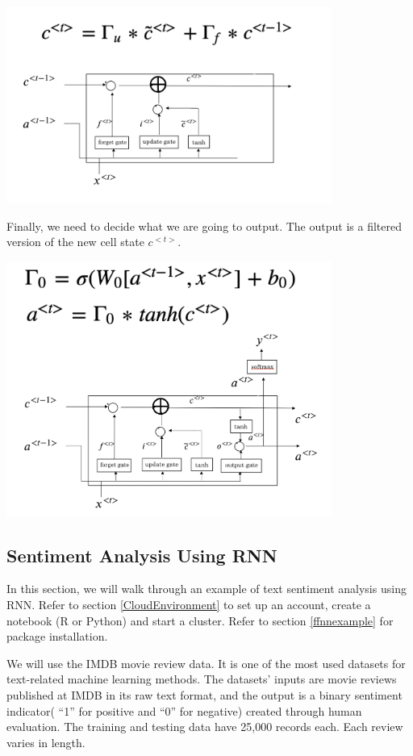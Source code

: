 \documentclass[
  12pt,
]{krantz}
\begin{document}
\includegraphics[width=0.8\textwidth,height=\textheight]{images/lstm3.png}

Finally, we need to decide what we are going to output. The output is a filtered version of the new cell state \(c^{<t>}\).

\includegraphics[width=0.8\textwidth,height=\textheight]{images/lstm4.png}

\hypertarget{rnnexample}{%
\subsection{Sentiment Analysis Using RNN}\label{rnnexample}}

In this section, we will walk through an example of text sentiment analysis using RNN. Refer to section \ref{CloudEnvironment} to set up an account, create a notebook (R or Python) and start a cluster. Refer to section \ref{ffnnexample} for package installation.

We will use the IMDB movie review data. It is one of the most used datasets for text-related machine learning methods. The datasets' inputs are movie reviews published at IMDB in its raw text format, and the output is a binary sentiment indicator( ``1'' for positive and ``0'' for negative) created through human evaluation. The training and testing data have 25,000 records each. Each review varies in length.
\end{document}
